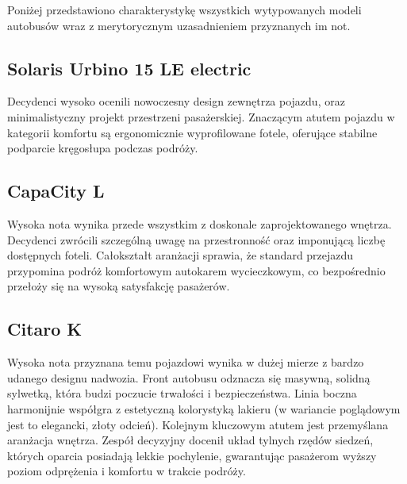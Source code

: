 Poniżej przedstawiono charakterystykę wszystkich wytypowanych modeli autobusów wraz z merytorycznym uzasadnieniem przyznanych im not.

\subsection{Solaris Urbino 15 LE electric}
Decydenci wysoko ocenili nowoczesny design zewnętrza pojazdu, oraz minimalistyczny projekt przestrzeni pasażerskiej. Znaczącym atutem pojazdu w kategorii komfortu są ergonomicznie wyprofilowane fotele, oferujące stabilne podparcie kręgosłupa podczas podróży.

\subsection{CapaCity L}
Wysoka nota wynika przede wszystkim z doskonale zaprojektowanego wnętrza. Decydenci zwrócili szczególną uwagę na przestronność oraz imponującą liczbę dostępnych foteli. Całokształt aranżacji sprawia, że standard przejazdu przypomina podróż komfortowym autokarem wycieczkowym, co bezpośrednio przełoży się na wysoką satysfakcję pasażerów.

\subsection{Citaro K}
Wysoka nota przyznana temu pojazdowi wynika w dużej mierze z bardzo udanego designu nadwozia. Front autobusu odznacza się masywną, solidną sylwetką, która budzi poczucie trwałości i bezpieczeństwa. Linia boczna harmonijnie współgra z estetyczną kolorystyką lakieru (w wariancie poglądowym jest to elegancki, złoty odcień). Kolejnym kluczowym atutem jest przemyślana aranżacja wnętrza. Zespół decyzyjny docenił układ tylnych rzędów siedzeń, których oparcia posiadają lekkie pochylenie, gwarantując pasażerom wyższy poziom odprężenia i komfortu w trakcie podróży.

